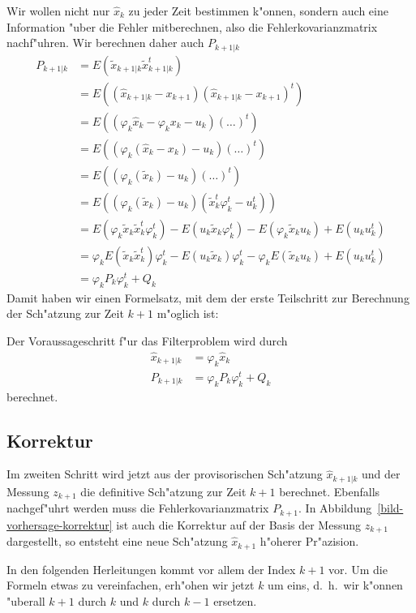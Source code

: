 Wir wollen nicht nur $\hat x_k$ zu jeder Zeit bestimmen k"onnen, sondern
auch eine Information "uber die Fehler mitberechnen, also die Fehlerkovarianzmatrix
nachf"uhren.
Wir berechnen daher auch $P_{k+1|k}$
\begin{align*}
P_{k+1|k}&=E(\tilde x_{k+1|k}\tilde x_{k+1|k}^t)\\
&=E( (\hat x_{k+1|k}-x_{k+1} ) (\hat x_{k+1|k}-x_{k+1} )^t)\\
&=E(
(\varphi_k\hat x_k-\varphi_kx_k-u_k)
(\dots)^t
)\\
&=E(
(\varphi_k(\hat x_k-x_k)-u_k)
(\dots)^t
)\\
&=E(
(\varphi_k(\tilde x_k)-u_k)
(\dots)^t
)\\
&=E(
(\varphi_k(\tilde x_k)-u_k)
(\tilde x_k^t\varphi_k^t-u_k^t)
)\\
&=E(\varphi_k\tilde x_k \tilde x_k^t\varphi_k^t)-E(u_k\tilde x_k\varphi_k^t)-E(\varphi_k\tilde x_ku_k)+E(u_ku_k^t)\\
&=\varphi_k E(\tilde x_k \tilde x_k^t)\varphi_k^t-E(u_k\tilde x_k)\varphi_k^t-\varphi_k E(\tilde x_ku_k)+E(u_ku_k^t)\\
&=\varphi_kP_k\varphi_k^t+Q_k
\end{align*}
Damit haben wir einen Formelsatz, mit dem der erste Teilschritt zur Berechnung
der Sch"atzung zur Zeit $k+1$ m"oglich ist:
\begin{definition}Der Voraussageschritt f"ur das Filterproblem wird durch
\begin{align}
\hat x_{k+1|k}&=\varphi_k\hat x_k \label{estimate-prediction}\\
P_{k+1|k}&=\varphi_kP_k\varphi_k^t + Q_k \label{covariance-prediction}
\end{align}
berechnet.
\end{definition}

\subsection{Korrektur}
Im zweiten Schritt wird jetzt aus der provisorischen Sch"atzung $\hat x_{k+1|k}$
und der Messung $z_{k+1}$ die definitive Sch"atzung zur Zeit $k+1$ berechnet.
Ebenfalls nachgef"uhrt werden muss die Fehlerkovarianzmatrix $P_{k+1}$.
In Abbildung~\ref{bild-vorhersage-korrektur} ist auch die Korrektur auf der Basis
der Messung $z_{k+1}$ dargestellt, so entsteht eine neue Sch"atzung
$\hat x_{k+1}$ h"oherer Pr"azision.

In den folgenden Herleitungen kommt vor allem der Index $k+1$ vor.
Um die Formeln
etwas zu vereinfachen, erh"ohen wir jetzt $k$ um eins, d.~h.~wir k"onnen
"uberall $k+1$ durch $k$ und $k$ durch $k-1$ ersetzen.

